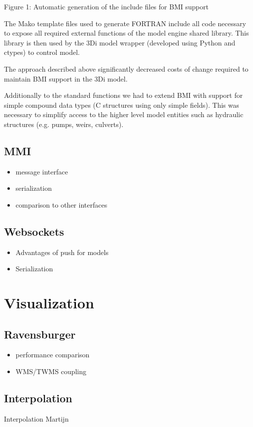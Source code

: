 \documentclass[a4paper]{article}
\begin{document}
Figure 1: Automatic generation of the include files for \ac{BMI} support

The Mako template files used to generate FORTRAN include all code necessary to expose all required external functions of the model engine shared library. This library is then used by the 3Di model wrapper (developed using Python and ctypes) to control model.

The approach described above significantly decreased costs of change required to maintain \ac{BMI} support in the 3Di model.

Additionally to the standard functions we had to extend BMI with support for simple compound data types (C structures using only simple fields). This was necessary to simplify access to the higher level model entities such as hydraulic structures (e.g. pumps, weirs, culverts).

\subsection{MMI}
\begin{itemize}
  \item message interface
  \item serialization
  \item comparison to other interfaces
\end{itemize}
\subsection{Websockets}
\begin{itemize}
  \item Advantages of push for models
  \item Serialization
\end{itemize}
\section{Visualization}
\subsection{Ravensburger }
\begin{itemize}
  \item performance comparison
  \item WMS/TWMS coupling
\end{itemize}
\subsection{Interpolation}
Interpolation Martijn
\end{document}

